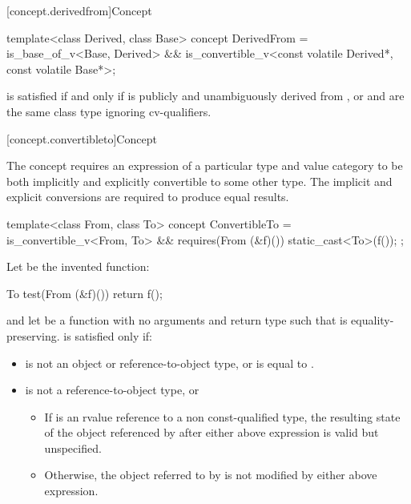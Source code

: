 [concept.derivedfrom]{Concept }

%
\begin{itemdecl}
template<class Derived, class Base>
  concept DerivedFrom =
    is_base_of_v<Base, Derived> &&
    is_convertible_v<const volatile Derived*, const volatile Base*>;
\end{itemdecl}

\begin{itemdescr}
\pnum
\begin{note}
 is satisfied if and only if
 is publicly and unambiguously derived from , or
 and  are the same class type ignoring cv-qualifiers.
\end{note}
\end{itemdescr}

[concept.convertibleto]{Concept }

\pnum
The  concept requires an expression of a particular
type and value category to be both implicitly and explicitly convertible to some
other type. The implicit and explicit conversions are required to produce equal
results.

%
\begin{itemdecl}
template<class From, class To>
  concept ConvertibleTo =
    is_convertible_v<From, To> &&
    requires(From (&f)()) {
      static_cast<To>(f());
    };
\end{itemdecl}

\begin{itemdescr}
\pnum
Let  be the invented function:
\begin{codeblock}
To test(From (&f)()) {
  return f();
}
\end{codeblock}
and let  be a function with no arguments and return type 
such that  is equality-preserving.
 is satisfied only if:

\begin{itemize}
\item
{} is not an object or reference-to-object type, or
 is equal to .

\item
{} is not a reference-to-object type, or

\begin{itemize}
\item
If  is an rvalue reference to a non const-qualified type, the
resulting state of the object referenced by  after either above
expression is valid but unspecified.

\item
Otherwise, the object referred to by  is not modified by either above
expression.
\end{itemize}
\end{itemize}
\end{itemdescr}


